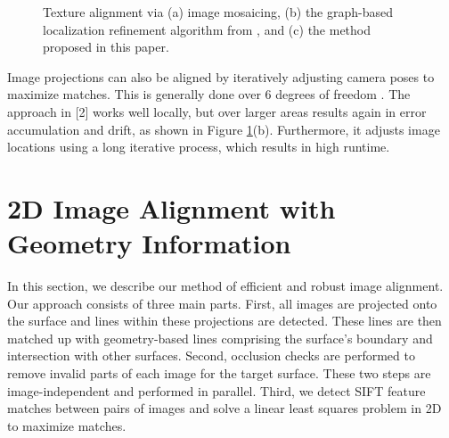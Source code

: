 \documentclass[]{spie}  %
\begin{document}
{\begin{figure}
  \centering

  \centering

  \centering {}

  \caption{Texture alignment via (a) image mosaicing, (b) the
    graph-based localization refinement algorithm from
    \cite{chen2010indoor}, and (c) the method proposed in this paper.}
  \label{fig:mosaic3D}
\end{figure}

Image projections can also be aligned by iteratively adjusting camera
poses to maximize matches. This is generally done over 6 degrees of
freedom \cite{liu2010indoor}. The approach in [2] works well locally,
but over larger areas results again in error accumulation and drift,
as shown in Figure \ref{fig:mosaic3D}(b). Furthermore, it adjusts
image locations using a long iterative process, which results in high
runtime.


\section{2D Image Alignment with Geometry Information}
\label{sec:2dAlignment}
In this section, we describe our method of efficient and robust image
alignment. Our approach consists of three main parts. First, all
images are projected onto the surface and lines within these
projections are detected. These lines are then matched up with
geometry-based lines comprising the surface's boundary and
intersection with other surfaces. Second, occlusion checks are
performed to remove invalid parts of each image for the target
surface. These two steps are image-independent and performed in
parallel. Third, we detect SIFT feature matches between pairs of
images and solve a linear least squares problem in 2D to maximize
matches.

}
\end{document}
